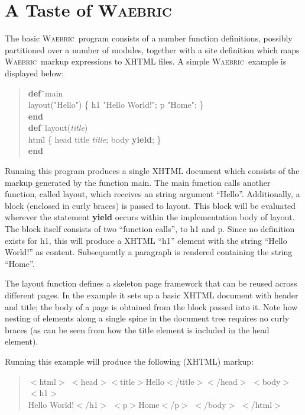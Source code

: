 \documentclass[a4paper]{article}
\def\waebric{\textsc{Waebric}\xspace}
\def\Waebric{\textsc{Waebric}\xspace}
\def\Def{\textbf{def}}
\def\End{\textbf{end}}
\def\Yield{\textbf{yield}}
\def\Var#1{\textit{#1}}
\begin{document}
\section{A Taste of  \waebric}

The basic \Waebric\ program consists of a number function definitions,
possibly partitioned over a number of modules, together with a site
definition which maps \Waebric\ markup expressions to XHTML files. A
simple \Waebric\ example is displayed below:
\begin{quote}
\begin{tabbing}
\Def\=\ main\\
\>layout("Hello") \{ h1 "Hello World!"; p "Home"; \}\\
\End\\
\Def\=\ layout(\Var{title})\\
\>htm\=l \{ head title \Var{title}; body \Yield; \}\\
\End
\end{tabbing}
\end{quote}


Running this program produces a single XHTML document which consists of
the markup generated by the function main. The main function calls
another function, called layout, which receives an string argument
``Hello''. Additionally, a block (enclosed in curly braces) is passed
to layout. This block will be evaluated wherever the statement
\textbf{yield} occurs within the implementation body of layout. The
block itself consists of two ``function calls'', to h1 and p. Since no
definition exists for h1, this will produce a XHTML ``h1'' element with
the string ``Hello World!'' as content. Subsequently a paragraph is
rendered containing the string ``Home''.

The layout function defines a skeleton page framework that can be
reused across different pages. In the example it sets up a basic XHTML
document with header and title; the body of a page is obtained from
the block passed into it. Note how nesting of elements along a single
spine in the document tree requires no curly braces (as can be seen
from how the title element is included in the head element).

Running this example will produce the following (XHTML) markup:
\begin{quote}\small
$<$html$>$
 $<$head$>$$<$title$>$Hello$<$/title$>$$<$/head$>$
 $<$body$>$
  $<$h1$>$\\Hello World!$<$/h1$>$
  $<$p$>$Home$<$/p$>$
 $<$/body$>$
$<$/html$>$
\end{quote}
\end{document}
